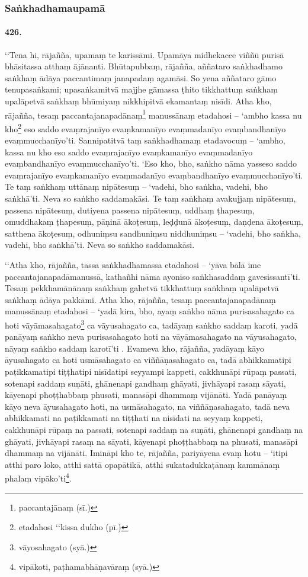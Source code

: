 \subsubsection{Saṅkhadhamaupamā}

\paragraph{426.} ‘‘Tena hi, rājañña, upamaṃ te karissāmi. Upamāya midhekacce viññū purisā bhāsitassa atthaṃ ājānanti. Bhūtapubbaṃ, rājañña, aññataro saṅkhadhamo saṅkhaṃ ādāya paccantimaṃ janapadaṃ agamāsi. So yena aññataro gāmo tenupasaṅkami; upasaṅkamitvā majjhe gāmassa ṭhito tikkhattuṃ saṅkhaṃ upalāpetvā saṅkhaṃ bhūmiyaṃ nikkhipitvā ekamantaṃ nisīdi. Atha kho, rājañña, tesaṃ paccantajanapadānaṃ\footnote{paccantajānaṃ (sī.)} manussānaṃ etadahosi – ‘ambho kassa nu kho\footnote{etadahosi ‘‘kissa dukho (pī.)} eso saddo evaṃrajanīyo evaṃkamanīyo evaṃmadanīyo evaṃbandhanīyo evaṃmucchanīyo’ti. Sannipatitvā taṃ saṅkhadhamaṃ etadavocuṃ – ‘ambho, kassa nu kho eso saddo evaṃrajanīyo evaṃkamanīyo evaṃmadanīyo evaṃbandhanīyo evaṃmucchanīyo’ti. ‘Eso kho, bho, saṅkho nāma yasseso saddo evaṃrajanīyo evaṃkamanīyo evaṃmadanīyo evaṃbandhanīyo evaṃmucchanīyo’ti. Te taṃ saṅkhaṃ uttānaṃ nipātesuṃ – ‘vadehi, bho saṅkha, vadehi, bho saṅkhā’ti. Neva so saṅkho saddamakāsi. Te taṃ saṅkhaṃ avakujjaṃ nipātesuṃ, passena nipātesuṃ, dutiyena passena nipātesuṃ, uddhaṃ ṭhapesuṃ, omuddhakaṃ ṭhapesuṃ, pāṇinā ākoṭesuṃ, leḍḍunā ākoṭesuṃ, daṇḍena ākoṭesuṃ, satthena ākoṭesuṃ, odhuniṃsu sandhuniṃsu niddhuniṃsu – ‘vadehi, bho saṅkha, vadehi, bho saṅkhā’ti. Neva so saṅkho saddamakāsi.

‘‘Atha kho, rājañña, tassa saṅkhadhamassa etadahosi – ‘yāva bālā ime paccantajanapadāmanussā, kathañhi nāma ayoniso saṅkhasaddaṃ gavesissantī’ti. Tesaṃ pekkhamānānaṃ saṅkhaṃ gahetvā tikkhattuṃ saṅkhaṃ upalāpetvā saṅkhaṃ ādāya pakkāmi. Atha kho, rājañña, tesaṃ paccantajanapadānaṃ manussānaṃ etadahosi – ‘yadā kira, bho, ayaṃ saṅkho nāma purisasahagato ca hoti vāyāmasahagato\footnote{vāyosahagato (syā.)} ca vāyusahagato ca, tadāyaṃ saṅkho saddaṃ karoti, yadā panāyaṃ saṅkho neva purisasahagato hoti na vāyāmasahagato na vāyusahagato, nāyaṃ saṅkho saddaṃ karotī’ti . Evameva kho, rājañña, yadāyaṃ kāyo āyusahagato ca hoti usmāsahagato ca viññāṇasahagato ca, tadā abhikkamatipi paṭikkamatipi tiṭṭhatipi nisīdatipi seyyampi kappeti, cakkhunāpi rūpaṃ passati, sotenapi saddaṃ suṇāti, ghānenapi gandhaṃ ghāyati, jivhāyapi rasaṃ sāyati, kāyenapi phoṭṭhabbaṃ phusati, manasāpi dhammaṃ vijānāti. Yadā panāyaṃ kāyo neva āyusahagato hoti, na usmāsahagato, na viññāṇasahagato, tadā neva abhikkamati na paṭikkamati na tiṭṭhati na nisīdati na seyyaṃ kappeti, cakkhunāpi rūpaṃ na passati, sotenapi saddaṃ na suṇāti, ghānenapi gandhaṃ na ghāyati, jivhāyapi rasaṃ na sāyati, kāyenapi phoṭṭhabbaṃ na phusati, manasāpi dhammaṃ na vijānāti. Imināpi kho te, rājañña, pariyāyena evaṃ hotu – ‘itipi atthi paro loko, atthi sattā opapātikā, atthi sukatadukkaṭānaṃ kammānaṃ phalaṃ vipāko’ti\footnote{vipākoti, paṭhamabhāṇavāraṃ (syā.)}.


